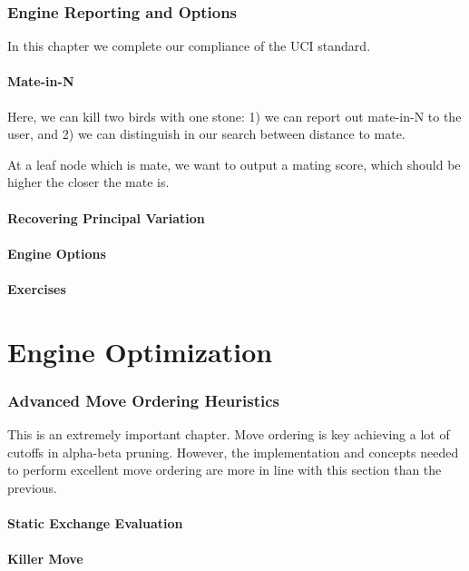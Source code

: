 \documentclass[letterpaper,11pt]{article}
\begin{document}
\section{Engine Reporting and Options}

In this chapter we complete our compliance of the UCI standard.

\subsection{Mate-in-N}

Here, we can kill two birds with one stone: 1) we can report out mate-in-N to the user, and 2) we can
distinguish in our search between distance to mate.

At a leaf node which is mate, we want to output a mating score, which should be higher
the closer the mate is.

\subsection{Recovering Principal Variation}

\subsection{Engine Options}

\subsection{Exercises}

\newpage
\part{Engine Optimization}

\section{Advanced Move Ordering Heuristics}

This is an extremely important chapter.
Move ordering is key achieving a lot of cutoffs in alpha-beta pruning. 
However, the implementation and concepts needed to perform
excellent move ordering are more in line with this section than the previous.

\subsection{Static Exchange Evaluation}
\subsection{Killer Move}
\end{document}
